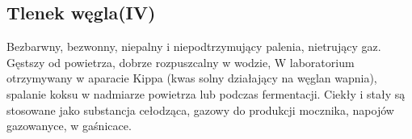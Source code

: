 \subsection{Tlenek węgla(IV) }
Bezbarwny, bezwonny, niepalny i niepodtrzymujący palenia, nietrujący gaz.
Gęstszy od powietrza, dobrze rozpuszcalny w wodzie,
W laboratorium otrzymywany w aparacie Kippa (kwas solny działający na węglan wapnia), spalanie koksu w nadmiarze powietrza lub podczas fermentacji.
Ciekły i stały są stosowane jako substancja cełodząca, gazowy do produkcji mocznika, napojów gazowanyce, w gaśnicace.


